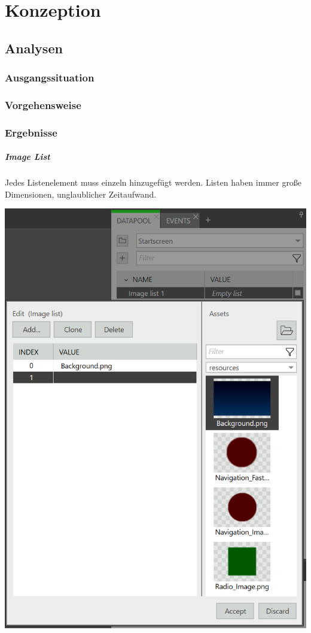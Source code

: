 \chapter{Konzeption}\label{ch:method}

\section {Analysen}
\subsection{Ausgangssituation}
\subsection{Vorgehensweise}
\subsection{Ergebnisse}

\paragraph{Image List}
Jedes Listenelement muss einzeln hinzugefügt werden. Listen haben immer große Dimensionen, unglaublicher Zeitaufwand.

\begin{center}
  \includegraphics[scale=0.5]{figures/ImageList.png}
  \label{fig:ImageList}
\end{center}


